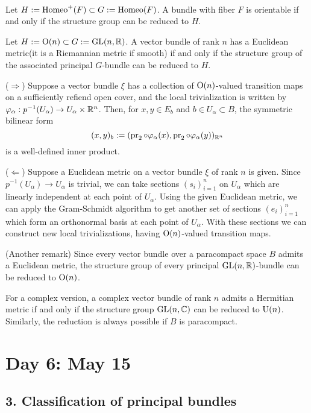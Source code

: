\documentclass{../../../small}
\begin{document}
\begin{ex*}\,
\begin{parts}
\item Let $H:=\operatorname{Homeo}^+(F)\subset G:=\operatorname{Homeo}(F)$.
A bundle with fiber $F$ is orientable if and only if the structure group can be reduced to $H$.
\item Let $H:=\mathrm{O}(n)\subset G:=\mathrm{GL}(n,\mathbb{R})$.
A vector bundle of rank $n$ has a Euclidean metric(it is a Riemannian metric if smooth) if and only if the structure group of the associated principal $G$-bundle can be reduced to $H$.

($\Rightarrow$)
Suppose a vector bundle $\xi$ has a collection of $\mathrm{O}(n)$-valued transition maps on a sufficiently refiend open cover, and the local trivialization is written by $\varphi_\alpha:p^{-1}(U_\alpha)\to U_\alpha\times\mathbb{R}^n$.
Then, for $x,y\in E_b$ and $b\in U_\alpha\subset B$, the symmetric bilinear form
\[(x,y)_b:=(\operatorname{pr}_2\circ\varphi_\alpha(x),\operatorname{pr}_2\circ\varphi_\alpha(y))_{\mathbb{R}^n}\]
is a well-defined inner product.

($\Leftarrow$)
Suppose a Euclidean metric on a vector bundle $\xi$ of rank $n$ is given.
Since $p^{-1}(U_\alpha)\to U_\alpha$ is trivial, we can take sections $(s_i)_{i=1}^n$ on $U_\alpha$ which are linearly independent at each point of $U_\alpha$.
Using the given Euclidean metric, we can apply the Gram-Schmidt algorithm to get another set of sections $(e_i)_{i=1}^n$ which form an orthonormal basis at each point of $U_\alpha$.
With these sections we can construct new local trivializations, having $\mathrm{O}(n)$-valued transition maps.

(Another remark)
Since every vector bundle over a paracompact space $B$ admits a Euclidean metric, the structure group of every principal $\mathrm{GL}(n,\mathbb{R})$-bundle can be reduced to $\mathrm{O}(n)$.

\item
For a complex version, a complex vector bundle of rank $n$ admits a Hermitian metric if and only if the structure group $\mathrm{GL}(n,\mathbb{C})$ can be reduced to $\mathrm{U}(n)$.
Similarly, the reduction is always possible if $B$ is paracompact.
\end{parts}
\end{ex*}


\newpage
\section{Day 6: May 15}

\subsection*{3. Classification of principal bundles}
\end{document}

